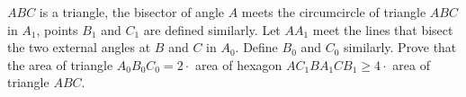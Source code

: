 $ ABC$ is a triangle, the bisector of angle $ A$ meets the circumcircle of triangle $ ABC$ in $ A_1$,  points $ B_1$ and $ C_1$ are defined similarly. Let $ AA_1$ meet the lines that bisect the two external angles at $ B$ and $ C$ in $ A_0$. Define $ B_0$ and $ C_0$ similarly. Prove that the area of triangle $ A_0B_0C_0 = 2 \cdot$ area of hexagon $ AC_1BA_1CB_1 \geq 4 \cdot$ area of triangle $ ABC$.